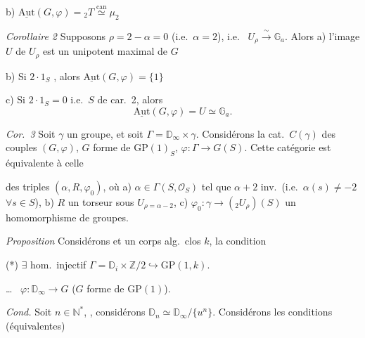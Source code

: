 \documentclass[11pt,a4paper]{article}
\begin{document}
b) $\underline{\mathrm{Aut}}(G, \varphi) = {}_2T \overset{\text{can}}{\simeq}
\mu_2$

\emph{Corollaire 2} Supposons $\rho = 2 - \alpha = 0$ (i.e.\ $\alpha = 2$),
i.e.\  $U_\rho \xrightarrow{\ \sim\ } \mathbb{G}_a$.
Alors a) l'image $U$ de $U_\rho$ \struck{\ill{}} est un
  unipotent maximal de $G$
 \ill{}

b) Si $2 \cdot 1_S$ , alors $\underline{\mathrm{Aut}}(G,
\varphi) = \lbrace 1 \rbrace$

c) Si $2 \cdot 1_S = 0$ i.e.\ $S$ de car.\ 2, alors
\[
\underline{\mathrm{Aut}}(G, \varphi) = U \simeq \mathbb{G}_a .
\]

\emph{Cor.\ 3} Soit $\gamma$ un groupe, et soit $\Gamma = \mathbb{D}_\infty
\times \gamma$. Considérons la cat.\ $C(\gamma)$ des couples $(G, \varphi)$, $G$
forme de $\mathrm{GP}(1)_S$, $\varphi : \Gamma \to G(S)$. Cette catégorie est
équivalente à celle


des triples $(\alpha, R, \varphi_0)$, où a) $\alpha \in \Gamma(S,
\mathcal{O}_S)$ tel que $\alpha + 2$ inv.\ (i.e.\ $\alpha(s) \neq -2$ $\forall
s \in S$), b) $R$ un torseur sous  $U_{\rho = \alpha - 2}$,
c) $\varphi_0 : \gamma \to ({}_2U_\rho)(S)$ un homomorphisme de groupes.

\emph{Proposition} Considérons  \struck{\ill{}
\ill{}}  et un corps alg.\ clos $k$, 
la condition

(*) $\exists$ hom.\ injectif $\Gamma = \mathbb{D}_i \times \mathbb{Z}/2
\hookrightarrow \mathrm{GP}(1, k)$.


\ldots\  $\varphi : \mathbb{D}_\infty \to G$ ($G$ forme de
$\mathrm{GP}(1)$).

\emph{Cond.} Soit $n \in \mathbb{N}^*$, , considérons
$\mathbb{D}_n \simeq \mathbb{D}_\infty/\lbrace u^n \rbrace$. Considérons les
conditions (équivalentes)
\end{document}

